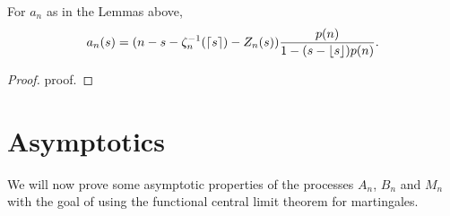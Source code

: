 \begin{lemma} \label{L: formula an}
	For $a_n$ as in the Lemmas above,
	\begin{equation}
		a_n(s) = (n - s - \zeta^{-1}_n(\lceil s\rceil) - Z_n(s)) \frac{p(n)}{1-(s-\lfloor s\rfloor)p(n)} .
	\end{equation}
\end{lemma}
\begin{proof} \label{P: formula an}
	proof.
\end{proof}

\section{Asymptotics}

We will now prove some asymptotic properties of the processes $A_n$, $B_n$ and $M_n$ with the goal of using the functional central limit theorem for martingales.

